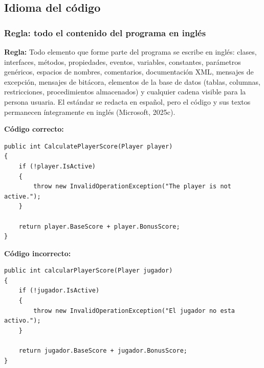 \subsection{Idioma del código}

\subsubsection{Regla: todo el contenido del programa en inglés}

\textbf{Regla:} Todo elemento que forme parte del programa se escribe en inglés: clases, interfaces, métodos, propiedades, eventos, variables, constantes, parámetros genéricos, espacios de nombres, comentarios, documentación XML, mensajes de excepción, mensajes de bitácora, elementos de la base de datos (tablas, columnas, restricciones, procedimientos almacenados) y cualquier cadena visible para la persona usuaria. El estándar se redacta en español, pero el código y sus textos permanecen íntegramente en inglés (Microsoft, 2025c).

\textbf{Código correcto:}
\begin{lstlisting}[style=csharpstyle]
public int CalculatePlayerScore(Player player)
{
    if (!player.IsActive)
    {
        throw new InvalidOperationException("The player is not active.");
    }

    return player.BaseScore + player.BonusScore;
}
\end{lstlisting}

\textbf{Código incorrecto:}
\begin{lstlisting}[style=csharpstyle]
public int calcularPlayerScore(Player jugador)
{
    if (!jugador.IsActive)
    {
        throw new InvalidOperationException("El jugador no esta activo.");
    }

    return jugador.BaseScore + jugador.BonusScore;
}
\end{lstlisting}
